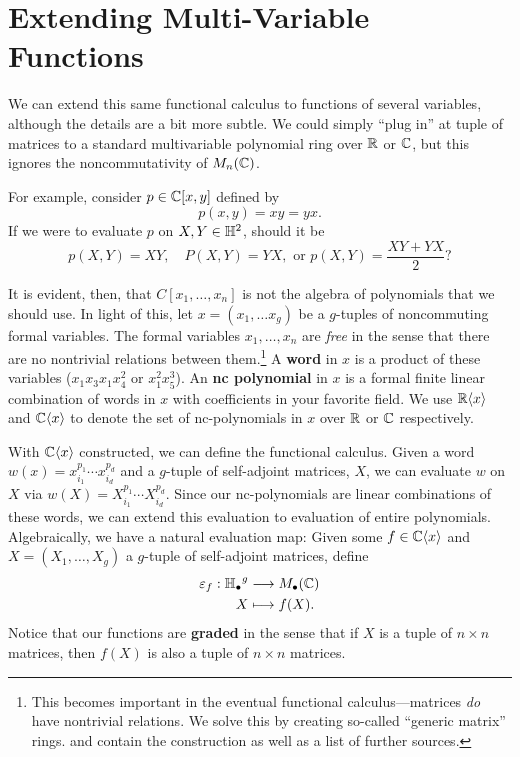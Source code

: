 \section{Extending Multi-Variable Functions}%
\label{sec:ExtMuliVarFun}

We can extend this same functional calculus to functions of several variables,
although the details are a bit more subtle. We could simply ``plug in'' at tuple
of matrices to a standard multivariable polynomial ring over \(\mathbb{R} \) or
\(\mathbb{C} \), but this ignores the noncommutativity of \(M_n(\mathbb{C})\).

For example, consider \(p \in \mathbb{C} [x,y]\) defined by
\[
  p(x,y) = xy = yx.
\]
If we were to evaluate \(p\) on \(X,Y \in \mathbb{H}^2\), should it be
\[
  p(X,Y) = XY, \quad P(X,Y)=YX, \textrm{ or } p(X,Y) = \frac{XY+YX}{2}?
\]

It is evident, then, that \(C[x_1, \dots,x_n]\) is not the algebra of
polynomials that we should use.
In light of this,
let \(x = (x_1 , \dots x_g)\) be a
\(g\)-tuples of noncommuting formal variables. The formal variables
\(x_1, \dots , x_n\) are \emph{free} in the sense that there are no nontrivial
relations between them.\footnote{This becomes important in the eventual
  functional calculus---matrices \emph{do} have nontrivial relations. We solve
  this by creating so-called ``generic matrix'' rings. \cite{klepPositive2018}
  and \cite{klepTracepositive2011}
  contain the construction as well as a list of further sources.}
A \textbf{word} in \(x\) is a product of these
variables (\eg \(x_1x_3x_1x_4^2\) or \(x_1^2x_5^3\)). An \textbf{nc polynomial}
in \(x\) is a formal finite linear combination of words in \(x\) with
coefficients in your favorite field. We use \(\mathbb{R} \langle x \rangle\) and
\(\mathbb{C} \langle x \rangle\) to denote the set of nc-polynomials in \(x\) over
\(\mathbb{R} \) or \(\mathbb{C} \) respectively.

With \(\mathbb{C} \langle x \rangle \) constructed, we can define the functional
calculus. Given a word \(w(x) = x_{i_1}^{p_1}\cdots x_{i_d}^{p_d}\) and a
\(g\)-tuple of self-adjoint matrices, \(X\), we can evaluate \(w\) on \(X\) via
\(w(X) = X_{i_1}^{p_1}\cdots X_{i_d}^{p_d}\). Since our nc-polynomials are
linear combinations of these words, we can extend this evaluation to evaluation
of entire polynomials. Algebraically, we have a natural evaluation map:
Given some \(f \in \mathbb{C} \langle x \rangle \) and
\(X = \left( X_1, \dots ,X_g \right) \) a
\(g\)-tuple of self-adjoint matrices, define
\begin{align*}
  \varepsilon_f: {\mathbb{H}_\bullet}^g &\longrightarrow M_\bullet(\mathbb{C}) \\
             X &\longmapsto f(X)
.\end{align*}
Notice that our functions are \textbf{graded} in the sense that if \(X\) is a
tuple of \(n \times n\) matrices, then \(f(X)\) is also a tuple of
\(n \times n\) matrices.

